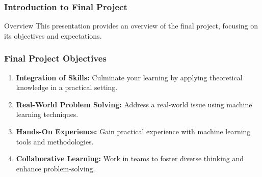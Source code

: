 \documentclass[aspectratio=169]{beamer}
\begin{document}
\frame{\titlepage}

\begin{frame}[fragile]
    \frametitle{Introduction to Final Project}
    \begin{block}{Overview}
        This presentation provides an overview of the final project, focusing on its objectives and expectations.
    \end{block}
\end{frame}

\begin{frame}[fragile]
    \frametitle{Final Project Objectives}
    \begin{enumerate}
        \item \textbf{Integration of Skills:} Culminate your learning by applying theoretical knowledge in a practical setting.
        \item \textbf{Real-World Problem Solving:} Address a real-world issue using machine learning techniques.
        \item \textbf{Hands-On Experience:} Gain practical experience with machine learning tools and methodologies.
        \item \textbf{Collaborative Learning:} Work in teams to foster diverse thinking and enhance problem-solving.
    \end{enumerate}
\end{frame}
\end{document}
